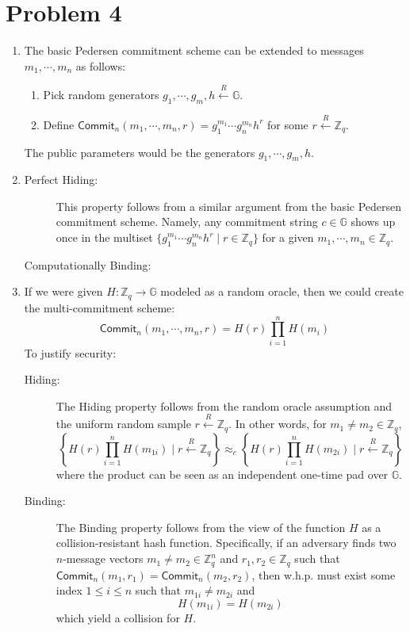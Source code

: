 \documentclass[12pt]{article}%
\begin{document}
\section*{Problem 4}
\begin{enumerate}
  \item The basic Pedersen commitment scheme can be extended to messages $m_1, \cdots, m_n$ as follows:
  \begin{enumerate}
    \item Pick random generators $g_1, \cdots, g_m, h \xleftarrow{R} \mathbb{G}$.
    \item Define $\mathsf{Commit}_n(m_1,\cdots,m_n, r) = g_1^{m_1} \cdots g_n^{m_n}h^r$ for some $r \xleftarrow{R} \mathbb{Z}_q$.
  \end{enumerate}
  The public parameters would be the generators $g_1, \cdots, g_m, h$.
\item
\begin{description}
  \item[Perfect Hiding:] This property follows from a similar argument from the basic Pedersen commitment scheme. Namely, any commitment string $c \in \mathbb{G}$ shows up once in the multiset $\{g_1^{m_1} \cdots g_n^{m_n}h^r \mid r \in \mathbb{Z}_q\}$ for a given $m_1, \cdots, m_n \in \mathbb{Z}_q$.
  \item[Computationally Binding:]
\end{description}

\item
If we were given $H: \mathbb{Z}_q \rightarrow \mathbb{G}$ modeled as a random oracle, then we could create the multi-commitment scheme:
\[ \mathsf{Commit}_n(m_1, \cdots, m_n, r) = H(r)\prod_{i = 1}^n H(m_i) \]
To justify security:

\begin{description}
  \item[Hiding:] The Hiding property follows from the random oracle assumption and the uniform random sample $r \xleftarrow{R} \mathbb{Z}_q$. In other words, for $m_1 \neq m_2 \in \mathbb{Z}_q$,
  $$ \left\{H(r)\prod_{i = 1}^n H\left(m_{1i}\right) \mid r \xleftarrow{R} \mathbb{Z}_q\right\} \approx_c \left\{H(r)\prod_{i = 1}^n H\left(m_{2i}\right) \mid r \xleftarrow{R} \mathbb{Z}_q\right\} $$
  where the product can be seen as an independent one-time pad over $\mathbb{G}$.
  \item[Binding:] The Binding property follows from the view of the function $H$ as a collision-resistant hash function. Specifically, if an adversary finds two $n$-message vectors $m_1 \neq m_2 \in \mathbb{Z}_q^n$ and $r_1,r_2 \in \mathbb{Z}_q$ such that $\mathsf{Commit}_n(m_1,r_1) = \mathsf{Commit}_n(m_2,r_2)$, then w.h.p. must exist some index $1 \leq i \leq n$ such that $m_{1i} \neq m_{2i}$ and
  $$ H(m_{1i}) = H(m_{2i})$$
  which yield a collision for $H$.
\end{description}
\end{enumerate}
\end{document}
